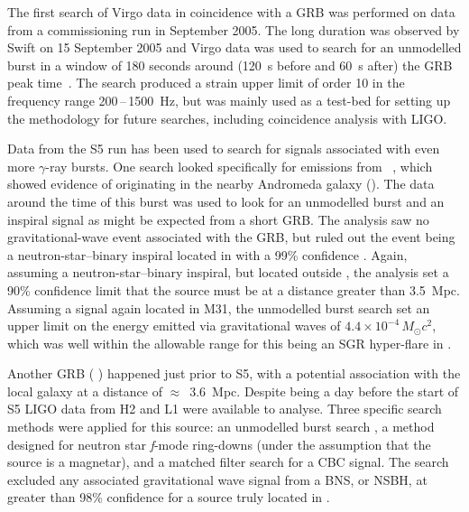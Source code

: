 The first search of Virgo data in coincidence with a GRB was performed on data from a commissioning run in 
September 2005. The long duration  was observed by Swift on 15 September 2005 and 
Virgo data was used to search for an unmodelled burst in a window of 180 seconds around (120~s before and 
60~s after) the GRB peak time~\cite{Acernese:2008a}. The search produced a strain upper limit of order 
10 in the frequency range 200\,--\,1500~Hz, but was mainly used as a test-bed for setting up the 
methodology for future searches, including coincidence analysis with LIGO.

Data from the S5 run has been used to search for signals associated with even more $\gamma$-ray bursts. One 
search looked specifically for emissions from ~\cite{Golenetskii:2007a, 
Golenetskii:2007b}, which showed evidence of originating in the nearby Andromeda galaxy (). 
The data around the time of this burst was used to look for an unmodelled burst and an inspiral signal as 
might be expected from a short GRB. The analysis saw no gravitational-wave event associated with the GRB, but 
ruled out the event being a neutron-star--binary inspiral located in  with a 99\% confidence
\cite{Abbott:2008g}. Again, assuming a neutron-star--binary inspiral, but located outside , 
the analysis set a 90\% confidence limit that the source must be at a distance greater than 3.5~Mpc. Assuming 
a signal again located in M31, the unmodelled burst search set an upper limit on the energy emitted via
gravitational waves of $4.4\times10^{-4}\,M_{\odot}c^2$, which was well within the allowable range for this 
being an SGR hyper-flare in .

Another GRB ( \cite{2005GCN..4197....1G}) happened just prior to S5, with a 
potential association with the local galaxy  at a distance of $\approx$~3.6~Mpc. 
Despite being a day before the start of S5 LIGO data from H2 and L1 were available to analyse. Three specific 
search methods were applied for this source: an unmodelled burst search \cite{2010NJPh...12e3034S}, a method 
designed for neutron star \textit{f}-mode ring-downs \cite{2007CQGra..24S.659K} (under the assumption that 
the source is a magnetar), and a matched filter search for a CBC signal. The search excluded any associated
gravitational wave signal from a BNS, or NSBH, at greater than 98\% confidence for a source truly located in 
.

